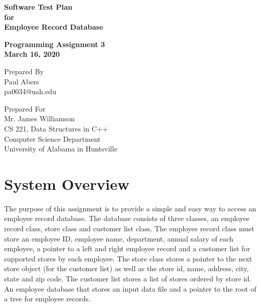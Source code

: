 \documentclass[12pt]{article}%
\begin{document}
\begin{titlepage}
	\clearpage\thispagestyle{empty}
	\centering
	\vspace{2cm}

	{\Huge \textbf{Software Test Plan \\
        for \\
        Employee Record Database}} \\
	\vspace{1cm}
	{\large \textbf{Programming Assignment 3 \\
      March 16, 2020} \par}
	\vspace{4cm}
	{\normalsize Prepared By \\ %
      Paul Abers \\
      pa0034@uah.edu \par}
	\vspace{2cm}

    \vspace{2cm}

	{\normalsize Prepared For \\
		Mr. James Williamson \\
		CS 221, Data Structures in C++ \\
        Computer Science Department \\
        University of Alabama in Huntsville \par}

      \vspace{2cm}

	\pagebreak

\end{titlepage}

\tableofcontents

\section{System Overview}
The purpose of this assignment is to provide a simple and easy way
to access an employee record database. The database consists of three
classes, an employee record class, store class and customer list class.
The employee record class must store an employee ID,
employee name, department, annual salary of each employee, a pointer to a left and right employee record and a customer list for
supported stores by each employee. The store class stores a pointer to the next store
object (for the customer list) as well as the store id, name, address, city, state and zip code.
The customer list stores a list of stores ordered by store id. An employee database that stores an input data file
and a pointer to the root of a tree for employee records.
\end{document}
